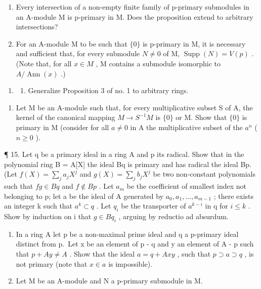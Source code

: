 \begin{enumerate}
\def\labelenumi{(\alph{enumi})}
\setcounter{enumi}{1}
\item
  Every intersection of a non-empty finite family of p-primary submodules in an A-module M is p-primary in M. Does the proposition extend to arbitrary intersections?
\item
  For an A-module M to be such that \(\{0\}\) is p-primary in M, it is necessary and sufficient that, for every submodule \(N \neq 0\) of M, \(\operatorname{Supp}(N) = V(p)\) . (Note that, for all \(x \in M\) , M contains a submodule isomorphic to \(A/\operatorname{Ann}(x)\) .)
\end{enumerate}

\begin{enumerate}
\def\labelenumi{\arabic{enumi}.}
\setcounter{enumi}{13}
\tightlist
\item
  \begin{enumerate}
  \def\labelenumii{(\alph{enumii})}
  \tightlist
  \item
    Generalize Proposition 3 of no. 1 to arbitrary rings.
  \end{enumerate}
\end{enumerate}

\begin{enumerate}
\def\labelenumi{(\alph{enumi})}
\setcounter{enumi}{1}
\tightlist
\item
  Let M be an A-module such that, for every multiplicative subset S of A, the kernel of the canonical mapping \(M \rightarrow S^{-1}M\) is \(\{0\}\) or M. Show that \(\{0\}\) is primary in M (consider for all \(a \neq 0\) in A the multiplicative subset of the \(a^{n}\) ( \(n \geqslant 0\) ).
\end{enumerate}

¶ 15. Let q be a primary ideal in a ring A and p its radical. Show that in the polynomial ring B = A{[}X{]} the ideal Bq is primary and has radical the ideal Bp. (Let \(f(X) = \sum_{j} a_j X^j\) and \(g(X) = \sum_{j} b_j X^j\) be two non-constant polynomials such that \(fg \in Bq\) and \(f \notin Bp\) . Let \(a_m\) be the coefficient of smallest index not belonging to p; let a be the ideal of A generated by \(a_0, a_1, \ldots, a_{m-1}\) ; there exists an integer k such that \(a^k \subset q\) . Let \(q_i\) be the transporter of \(a^{k-i}\) in q for \(i \leqslant k\) . Show by induction on i that \(g \in Bq_i\) , arguing by reductio ad absurdum.

\begin{enumerate}
\def\labelenumi{\arabic{enumi}.}
\setcounter{enumi}{15}
\item
  In a ring A let p be a non-maximal prime ideal and q a p-primary ideal distinct from p.~Let x be an element of p - q and y an element of A - p such that \(p + Ay \neq A\) . Show that the ideal \(a = q + Axy\) , such that \(p \supset a \supset q\) , is not primary (note that \(x \in a\) is impossible).
\item
  Let M be an A-module and N a p-primary submodule in M.
\end{enumerate}


